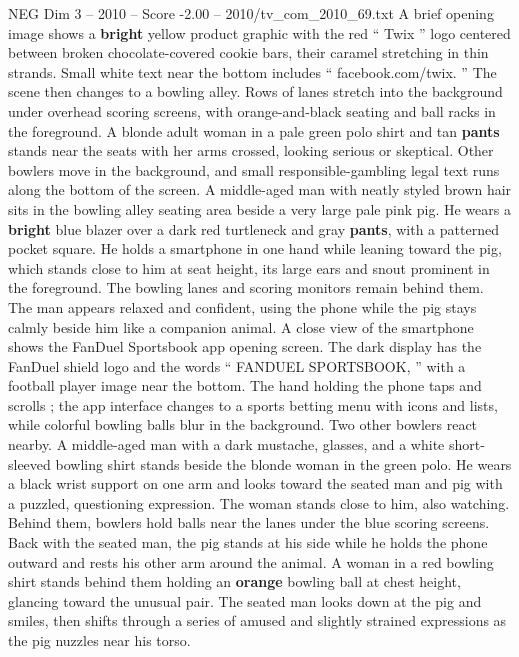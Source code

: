 \begin{textsample}{NEG Dim 3 – 2010 – Score -2.00 – 2010/tv\_com\_2010\_69.txt}  \label{ex:f3_neg_013}
A brief opening image shows a \textbf{bright} yellow product graphic with the red “ Twix ” logo centered between broken chocolate-covered cookie bars, their caramel stretching in thin strands.
Small white text near the bottom includes “ facebook.com/twix. ” The scene then changes to a bowling alley.
Rows of lanes stretch into the background under overhead scoring screens, with orange-and-black seating and ball racks in the foreground.
A blonde adult woman in a pale green polo shirt and tan \textbf{pants} stands near the seats with her arms crossed, looking serious or skeptical.
Other bowlers move in the background, and small responsible-gambling legal text runs along the bottom of the screen.
A middle-aged man with neatly styled brown hair sits in the bowling alley seating area beside a very large pale pink pig.
He wears a \textbf{bright} blue blazer over a dark red turtleneck and gray \textbf{pants}, with a patterned pocket square.
He holds a smartphone in one hand while leaning toward the pig, which stands close to him at seat height, its large ears and snout prominent in the foreground.
The bowling lanes and scoring monitors remain behind them.
The man appears relaxed and confident, using the phone while the pig stays calmly beside him like a companion animal.
A close view of the smartphone shows the FanDuel Sportsbook app opening screen.
The dark display has the FanDuel shield logo and the words “ FANDUEL SPORTSBOOK, ” with a football player image near the bottom.
The hand holding the phone taps and scrolls ; the app interface changes to a sports betting menu with icons and lists, while colorful bowling balls blur in the background.
Two other bowlers react nearby.
A middle-aged man with a dark mustache, glasses, and a white short-sleeved bowling shirt stands beside the blonde woman in the green polo.
He wears a black wrist support on one arm and looks toward the seated man and pig with a puzzled, questioning expression.
The woman stands close to him, also watching.
Behind them, bowlers hold balls near the lanes under the blue scoring screens.
Back with the seated man, the pig stands at his side while he holds the phone outward and rests his other arm around the animal.
A woman in a red bowling shirt stands behind them holding an \textbf{orange} bowling ball at chest height, glancing toward the unusual pair.
The seated man looks down at the pig and smiles, then shifts through a series of amused and slightly strained expressions as the pig nuzzles near his torso.

\end{textsample}
